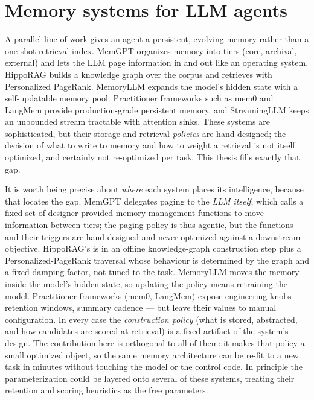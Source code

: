 \section{Memory systems for LLM agents}
A parallel line of work gives an agent a persistent, evolving memory rather than
a one-shot retrieval index. MemGPT \citep{packer2023memgpt} organizes memory into
tiers (core, archival, external) and lets the LLM page information in and out
like an operating system. HippoRAG \citep{gutierrez2024hipporag} builds a
knowledge graph over the corpus and retrieves with Personalized PageRank.
MemoryLLM \citep{wang2024memoryllm} expands the model's hidden state with a
self-updatable memory pool. Practitioner frameworks such as mem0
\citep{chhikara2024mem0} and LangMem \citep{langmem2024} provide production-grade
persistent memory, and StreamingLLM \citep{xiao2024streamingllm} keeps an
unbounded stream tractable with attention sinks. These systems are sophisticated,
but their storage and retrieval \emph{policies} are hand-designed; the decision
of what to write to memory and how to weight a retrieval is not itself
optimized, and certainly not re-optimized per task. This thesis fills exactly
that gap.

It is worth being precise about \emph{where} each system places its intelligence,
because that locates the gap. MemGPT delegates paging to the \emph{LLM itself},
which calls a fixed set of designer-provided memory-management functions to move
information between tiers; the paging policy is thus agentic, but the functions
and their triggers are hand-designed and never optimized against a downstream
objective. HippoRAG's is in an offline knowledge-graph construction step plus a
Personalized-PageRank traversal whose behaviour is determined by the graph and a
fixed damping factor, not tuned to the task. MemoryLLM moves the memory inside the
model's hidden state, so updating the policy means retraining the model.
Practitioner frameworks (mem0, LangMem) expose engineering knobs --- retention
windows, summary cadence --- but leave their values to manual configuration. In
every case the \emph{construction policy} (what is stored, abstracted, and how
candidates are scored at retrieval) is a fixed artifact of the system's design.
The contribution here is orthogonal to all of them: it makes that policy a small
optimized object, so the same memory architecture can be re-fit to a new task in
minutes without touching the model or the control code. In principle the
parameterization could be layered onto several of these systems, treating their
retention and scoring heuristics as the free parameters.

